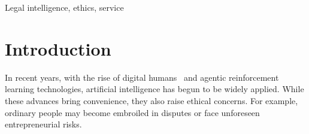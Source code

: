 \documentclass[conference]{IEEEtran}
\begin{document}
\begin{abstract}
    With the growth of large language models and artificial intelligence, AI-based tools are increasingly being adopted. These technological advances bring convenience but also raise ethical concerns. For example, ordinary people may become embroiled in disputes or face unforeseen entrepreneurial risks. Non-professionals can obtain information about the potential consequences of an event from commercially available legal tools, while lawyers and other professionals can assess cases by searching case databases and generating similar-case reports. However, the results obtained in this way are often incomplete and drawn from multiple, fragmented sources. To provide a faster and more information-rich understanding of the potential consequences of an event, we propose the Legal Ethics Assistant. Specifically, we integrate lawyer competence assessment, legal judgment prediction, similar-case retrieval, and large language models to provide users with information relevant to the facts of a case, thereby assisting them in considering legal and ethical risks at the early stages of an entrepreneurial idea or a legal case.
\end{abstract}

\begin{IEEEkeywords}
    Legal intelligence, ethics, service
\end{IEEEkeywords}

\section{Introduction}

In recent years, with the rise of digital humans~\cite{zhang2025intelligent} and agentic reinforcement learning technologies, artificial intelligence has begun to be widely applied. While these advances bring convenience, they also raise ethical concerns. For example, ordinary people may become embroiled in disputes or face unforeseen entrepreneurial risks.
\end{document}
